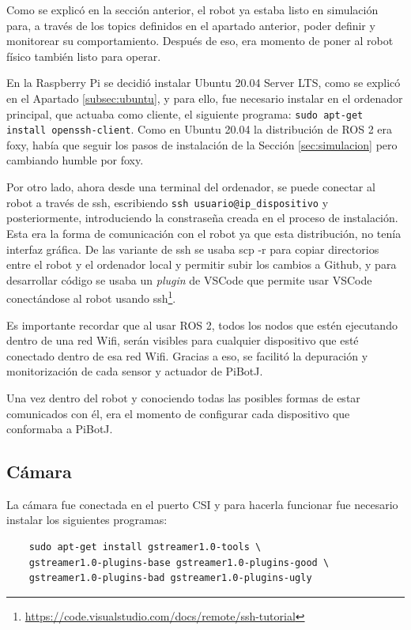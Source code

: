 Como se explicó en la sección anterior, el robot ya estaba listo en simulación para, a través de los topics definidos en el apartado anterior, poder definir y monitorear su comportamiento. Después de eso, era momento de poner al robot físico también listo para operar.    

En la Raspberry Pi se decidió instalar Ubuntu 20.04 Server \acs{LTS}, como se explicó en el Apartado \ref{subsec:ubuntu}, y para ello, fue necesario instalar en el ordenador principal, que actuaba como cliente, el siguiente programa:  \verb|sudo apt-get install openssh-client|. Como en Ubuntu 20.04 la distribución de ROS 2 era foxy, había que seguir los pasos de instalación de la Sección \ref{sec:simulacion} pero cambiando humble por foxy. 

Por otro lado, ahora desde una terminal del ordenador, se puede conectar al robot a través de ssh, escribiendo \verb|ssh usuario@ip_dispositivo| y posteriormente, introduciendo la constraseña creada en el proceso de instalación. Esta era la forma de comunicación con el robot ya que esta distribución, no tenía interfaz gráfica. De las variante de ssh se usaba scp -r para copiar directorios entre el robot y el ordenador local y permitir subir los cambios a Github, y para desarrollar código se usaba un \textit{plugin} de VSCode que permite usar VSCode conectándose al robot usando ssh\footnote{\url{https://code.visualstudio.com/docs/remote/ssh-tutorial}}. 

Es importante recordar que al usar ROS 2, todos los nodos que estén ejecutando dentro de una red Wifi, serán visibles para cualquier dispositivo que esté conectado dentro de esa red Wifi. Gracias a eso, se facilitó la depuración y monitorización de cada sensor y actuador de PiBotJ. 

Una vez dentro del robot y conociendo todas las posibles formas de estar comunicados con él, era el momento de configurar cada dispositivo que conformaba a PiBotJ.

\subsection{Cámara}
\label{subsec:configcamara}

La cámara fue conectada en el puerto CSI y para hacerla funcionar fue necesario instalar los siguientes programas: 

\begin{verbatim}
	sudo apt-get install gstreamer1.0-tools \ 
	gstreamer1.0-plugins-base gstreamer1.0-plugins-good \ 
	gstreamer1.0-plugins-bad gstreamer1.0-plugins-ugly
\end{verbatim}

